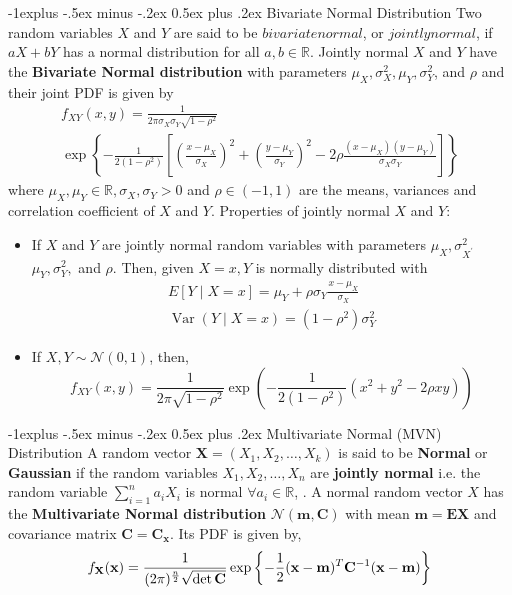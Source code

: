 \documentclass[10pt,landscape]{article}
\makeatletter
\renewcommand{\subsection}{\@startsection{subsection}{2}{0mm}%
{-1explus -.5ex minus -.2ex}%
{0.5ex plus .2ex}%
{\normalfont\normalsize\bfseries}}
\makeatother
\begin{document}
\begin{multicols*}{3}
        \subsection{Bivariate Normal Distribution}
        Two random variables $X$ and $Y$ are said to be $bivariate normal$, or $jointly normal$, if $a X+b Y$ has a normal distribution for all $a, b \in \mathbb{R}$. Jointly normal $X$ and $Y$ have the \textbf{Bivariate Normal distribution} with parameters $\mu_{X}, \sigma_{X}^{2}, \mu_{Y}, \sigma_{Y}^{2}$, and $\rho$ and their joint PDF is given by
        $$
        \begin{array}{l}
            f_{X Y}(x, y)=\frac{1}{2 \pi \sigma_{X} \sigma_{Y} \sqrt{1-\rho^{2}}} \\
            \exp \left\{-\frac{1}{2\left(1-\rho^{2}\right)}\left[\left(\frac{x-\mu_{X}}{\sigma_{X}}\right)^{2}+\left(\frac{y-\mu_{Y}}{\sigma_{Y}}\right)^{2}-2 \rho \frac{\left(x-\mu_{X}\right)\left(y-\mu_{Y}\right)}{\sigma_{X} \sigma_{Y}}\right]\right\}
        \end{array}
        $$
        where $\mu_{X}, \mu_{Y} \in \mathbb{R}, \sigma_{X}, \sigma_{Y}>0$ and $\rho \in(-1,1)$ are the means, variances and correlation coefficient of $X$ and $Y$. Properties of jointly normal $X$ and $Y$:
        \begin{itemize}
            \item If $X$ and $Y$ are jointly normal random variables with parameters $\mu_{X}, \sigma_{X^{\prime}}^{2}$ $\mu_{Y}, \sigma_{Y}^{2},$ and $\rho .$ Then, given $X=x, Y$ is normally distributed with
            $$
            \begin{array}{l}
                E[Y \mid X=x]=\mu_{Y}+\rho \sigma_{Y} \frac{x-\mu_{X}}{\sigma_{X}} \\
                \operatorname{Var}(Y \mid X=x)=\left(1-\rho^{2}\right) \sigma_{Y}^{2}
            \end{array}
            $$
            \item If $X, Y \sim \mathcal{N}(0 ,1)$, then,
            $$
            f_{XY}(x,y) = \frac{1}{2 \pi \sqrt{1-\rho^2}} \exp{\left(-\frac{1}{2 (1-\rho^2)} (x^2+y^2-2 \rho xy)\right)}
            $$
        \end{itemize}

        \subsection{Multivariate Normal (MVN) Distribution}
        A random vector $\mathbf{X} = (X_1, X_2, \dots, X_k)$ is said to be \textbf{Normal} or \textbf{Gaussian} if the random variables $X_{1}, X_{2}, \ldots, X_{n}$ are \textbf{jointly normal} i.e. the random variable $\sum\limits_{i=1}^{n} a_{i} X_{i}$ is normal $\forall a_{i} \in \mathbb{R}$, .
        A normal random vector $X$ has the \textbf{Multivariate Normal distribution} $\mathcal{N}(\mathbf{m}, \mathbf{C})$ with mean $\mathbf{m} = \mathbf{EX}$ and covariance matrix $\mathbf{C} = \mathbf{C}_\mathbf{x}$. Its PDF is given by,
        \[
            f_{\mathbf{X}}(\mathbf{x})=\frac{1}{(2\pi)^{\large{\frac{n}{2}}} \sqrt{\det\mathbf{C}}} \exp \left\{-\frac{1}{2} (\mathbf{x}-\mathbf{m})^T \mathbf{C}^{-1}(\mathbf{x}-\mathbf{m}) \right\}
        \]


\end{multicols*}
\end{document}
